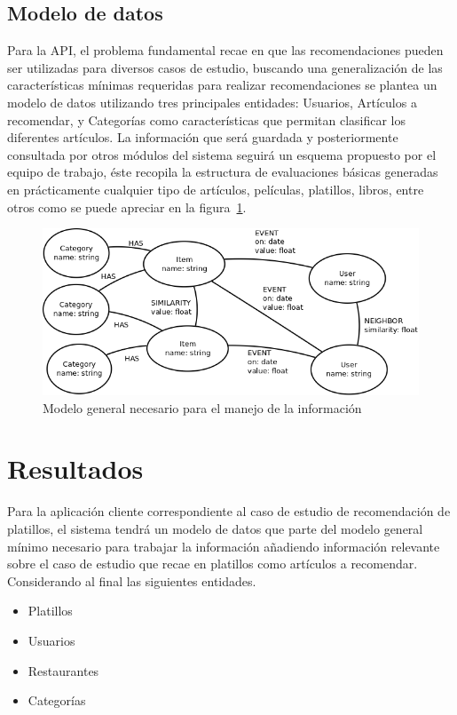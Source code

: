     \subsection{Modelo de datos}
      Para la API, el problema fundamental recae en que las recomendaciones pueden ser utilizadas para diversos casos de estudio, buscando una generalización de las características mínimas requeridas para realizar recomendaciones se plantea un modelo de datos utilizando tres principales entidades: Usuarios, Artículos a recomendar, y Categorías como características que permitan clasificar los diferentes artículos. La información que será guardada y posteriormente consultada por otros módulos del sistema seguirá un esquema propuesto por el equipo de trabajo, éste recopila la estructura de evaluaciones básicas generadas en prácticamente cualquier tipo de artículos, películas, platillos, libros, entre otros como se puede apreciar en la figura~\ref{fig:general_model}.

            \begin{figure}[h!]
            \centering
            \includegraphics[width=16cm]{./images/general_data_model.png}
            \caption{Modelo general necesario para el manejo de la información}
            \label{fig:general_model}
          \end{figure}

      
  \section{Resultados}
    Para la aplicación cliente correspondiente al caso de estudio de recomendación de platillos, el sistema tendrá un modelo de datos que parte del modelo general mínimo necesario para trabajar la información añadiendo información relevante sobre el caso de estudio que recae en platillos como artículos a recomendar. Considerando al final las siguientes entidades.
      \begin{itemize}
        \item Platillos
        \item Usuarios
        \item Restaurantes
        \item Categorías
      \end{itemize}

